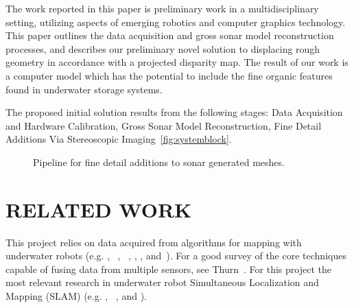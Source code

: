 \documentclass[a4paper,twoside]{article}
\begin{document}

The work reported in this paper is preliminary work in a multidisciplinary setting, utilizing aspects of emerging robotics and computer graphics technology. This paper outlines the data acquisition and gross sonar model reconstruction processes, and describes our preliminary novel solution to displacing rough geometry in accordance with a projected disparity map. The result of our work is a computer model which has the potential to include the fine organic features found in underwater storage systems.

The proposed initial solution results from the following stages: Data Acquisition and Hardware Calibration, Gross Sonar Model Reconstruction, Fine Detail Additions Via Stereoscopic Imaging~\ref{fig:systemblock}.

\begin{figure*}[!ht]
  \vspace{-0.2cm}
  \caption{Pipeline for fine detail additions to sonar generated meshes.}
 \label{fig:systemblcok}
\end{figure*}

\section{\uppercase{Related Work}}
\label{sec:data}

This project relies on data acquired from algorithms for mapping with underwater robots (e.g. \cite{Williams2000}, ~\cite{Williams09}, ~\cite{opizarro-2009a}, \cite{Fairfield2005,Fairfield2006}, \cite{Clark2008b}, and~\cite{White10}). For a good survey of the core techniques capable of fusing data from multiple sensors, see Thurn~\cite{Thrun2005}.
For this project the most relevant  research in underwater robot Simultaneous Localization and Mapping (SLAM) (e.g. \cite{Williams2000}, ~\cite{harbor}, and \cite{Fairfield2005,Fairfield2006}).  
\end{document}
